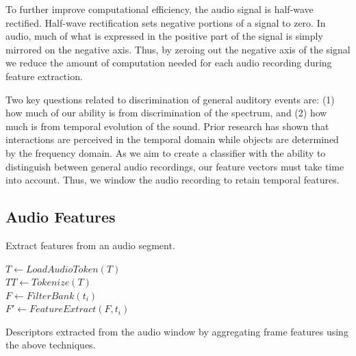%
To further improve computational efficiency, the audio signal is half-wave
rectified.
%
Half-wave rectification sets negative portions of a signal to zero. 
%
In audio, much of what is expressed in the positive part of the signal is 
simply mirrored on the negative axis. 
%
Thus, by zeroing out the negative axis of the signal we reduce the amount of
computation needed for each audio recording during feature extraction.

%
Two key questions related to discrimination of general auditory events are: 
(1) how much of our ability is from discrimination of the spectrum, and 
(2) how much is from temporal evolution of the sound.
%
Prior research has shown that interactions are perceived in the temporal domain
while objects are determined by the frequency domain. 
%
As we aim to create a classifier with the ability to distinguish between 
general audio recordings, our feature vectors must take time into account. 
%
Thus, we window the audio recording to retain temporal features.

\subsection{Audio Features}

\begin{algorithm}[t]
    \caption{Extract features from an audio segment.}
    \label{alg:encoder}
    \SetAlgoLined
        
     {
        $T \gets LoadAudioToken(T)$\\
        $TT \gets Tokenize(T)$\\
         {
            $F \gets FilterBank(t_i)$ \\
            $F' \gets FeatureExtract(F, t_i)$
        }
    }
\end{algorithm}

\begin{table}[t!]
\centering

\caption{
 Descriptors extracted from the audio window by
 aggregating frame features using the above techniques. }
\label{tab:stats}
\end{table}

